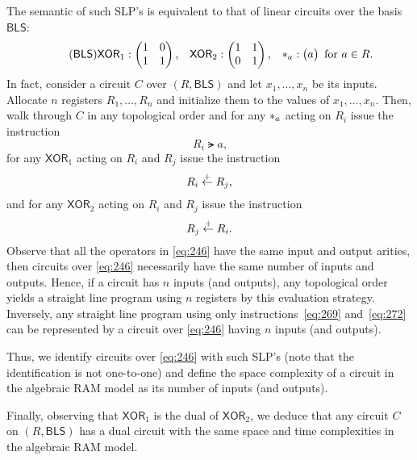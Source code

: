 The semantic of such SLP's is equivalent to that of linear circuits
over the basis $\mathsf{BLS}$:
\begin{equation}
  \tag{$\mathsf{BLS}$}
  \label{eq:246}
  \mathsf{XOR}_1 :
  \begin{pmatrix}
    1 & 0\\1 & 1
  \end{pmatrix}
  \text{,}\quad
  \mathsf{XOR}_2 :
  \begin{pmatrix}
    1 & 1\\0 & 1
  \end{pmatrix}
  \text{,}\quad
  \rmul{a} :
  \begin{pmatrix}
    a
  \end{pmatrix}
  \text{ for $a\in R$.}
\end{equation}
In fact, consider a circuit $C$ over $(R,\mathsf{BLS})$ and let
$x_1,\ldots,x_n$ be its inputs. Allocate $n$ registers
$R_1,\ldots,R_n$ and initialize them to the values of
$x_1,\ldots,x_n$. Then, walk through $C$ in any topological order and
for any $*_{a}$ acting on $R_i$ issue the instruction
\begin{equation}
  \label{eq:249}
  R_i \lat a
  \text{,}
\end{equation}
for any $\mathsf{XOR}_1$ acting on $R_i$ and $R_j$ issue the
instruction
\begin{equation}
  \label{eq:255}
  R_i \overset{+}{\leftarrow} R_j
  \text{,}
\end{equation}
and for any $\mathsf{XOR}_2$ acting on $R_i$ and $R_j$ issue the
instruction
\begin{equation}
  \label{eq:256}
  R_j \overset{+}{\leftarrow} R_i
  \text{.}
\end{equation}
Observe that all the operators in \ref{eq:246} have the same input and
output arities, then circuits over \ref{eq:246} necessarily have the
same number of inputs and outputs. Hence, if a circuit has $n$ inputs
(and outputs), any topological order yields a straight line program
using $n$ registers by this evaluation strategy.  Inversely, any
straight line program using only instructions~\eqref{eq:269}
and~\eqref{eq:272} can be represented by a circuit over \ref{eq:246}
having $n$ inputs (and outputs).

Thus, we identify circuits over \ref{eq:246} with such SLP's (note
that the identification is not one-to-one) and define the space
complexity of a circuit in the algebraic RAM model as its number of
inputs (and outputs).

Finally, observing that $\mathsf{XOR}_1$ is the dual of
$\mathsf{XOR}_2$, we deduce that any circuit $C$ on $(R,\mathsf{BLS})$
has a dual circuit with the same space and time complexities in the
algebraic RAM model.


